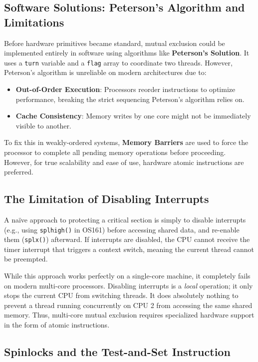 \subsection{Software Solutions: Peterson's Algorithm and Limitations}
Before hardware primitives became standard, mutual exclusion could be implemented entirely in software using algorithms like \textbf{Peterson's Solution}. It uses a \texttt{turn} variable and a \texttt{flag} array to coordinate two threads. However, Peterson's algorithm is unreliable on modern architectures due to:
\begin{itemize}
    \item \textbf{Out-of-Order Execution}: Processors reorder instructions to optimize performance, breaking the strict sequencing Peterson's algorithm relies on.
    \item \textbf{Cache Consistency}: Memory writes by one core might not be immediately visible to another.
\end{itemize}
To fix this in weakly-ordered systems, \textbf{Memory Barriers} are used to force the processor to complete all pending memory operations before proceeding. However, for true scalability and ease of use, hardware atomic instructions are preferred.

\subsection{The Limitation of Disabling Interrupts}
A naïve approach to protecting a critical section is simply to disable interrupts (e.g., using \texttt{splhigh()} in OS161) before accessing shared data, and re-enable them (\texttt{splx()}) afterward. If interrupts are disabled, the CPU cannot receive the timer interrupt that triggers a context switch, meaning the current thread cannot be preempted.

While this approach works perfectly on a single-core machine, it completely fails on modern multi-core processors. Disabling interrupts is a \textit{local} operation; it only stops the current CPU from switching threads. It does absolutely nothing to prevent a thread running concurrently on CPU 2 from accessing the same shared memory. Thus, multi-core mutual exclusion requires specialized hardware support in the form of atomic instructions.

\subsection{Spinlocks and the Test-and-Set Instruction}

